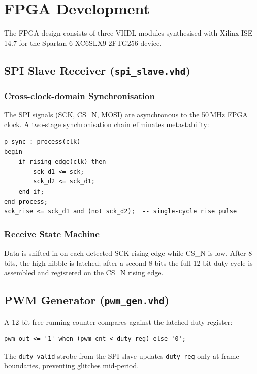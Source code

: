 \documentclass[12pt, a4paper]{report}
\begin{document}
\chapter{FPGA Development}

The FPGA design consists of three VHDL modules synthesised with Xilinx ISE
14.7 for the Spartan-6 XC6SLX9-2FTG256 device.

\section{SPI Slave Receiver (\texttt{spi\_slave.vhd})}

\subsection{Cross-clock-domain Synchronisation}

The SPI signals (SCK, CS\_N, MOSI) are asynchronous to the 50\,MHz FPGA
clock. A two-stage synchronisation chain eliminates metastability:

\begin{lstlisting}[style=vhdlstyle, caption={Two-stage synchroniser for SCK.}]
p_sync : process(clk)
begin
    if rising_edge(clk) then
        sck_d1 <= sck;
        sck_d2 <= sck_d1;
    end if;
end process;
sck_rise <= sck_d1 and (not sck_d2);  -- single-cycle rise pulse
\end{lstlisting}

\subsection{Receive State Machine}

Data is shifted in on each detected SCK rising edge while CS\_N is low.
After 8 bits, the high nibble is latched; after a second 8 bits the full
12-bit duty cycle is assembled and registered on the CS\_N rising edge.

\section{PWM Generator (\texttt{pwm\_gen.vhd})}

A 12-bit free-running counter compares against the latched duty register:

\begin{lstlisting}[style=vhdlstyle, caption={PWM comparator.}]
pwm_out <= '1' when (pwm_cnt < duty_reg) else '0';
\end{lstlisting}

The \texttt{duty\_valid} strobe from the SPI slave updates \texttt{duty\_reg}
only at frame boundaries, preventing glitches mid-period.
\end{document}
